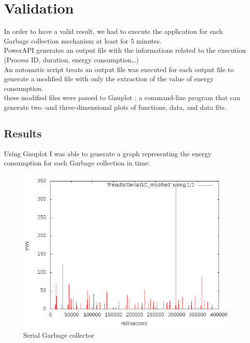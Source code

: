 \section{Validation}
\label{sec:Validation}
In order to have a valid result, we had to execute the application for each Garbage collection mechanism at least for 5 minutes.\\
PowerAPI generates an output file with the informations related to the execution (Process ID, duration, energy consumption\ldots)\\
An automatic script treats an output file was executed for each output file to generate a modified file with only the extraction of the value of energy consumption.\\
these modified files were passed to Gnuplot\cite{gnuplotOfficial} : a command-line program that can generate two -and three-dimensional plots of functions, data, and data fits.\cite{gnuplot}

\subsection{Results}
Using Gnuplot I was able to generate a graph representing the energy consumption for each Garbage collection in time:\\

\begin{figure}[H]
	\centering
	\includegraphics[width=12cm,keepaspectratio]{images/SerialGC.png}
	\caption{Serial Garbage collector}
\end{figure}

